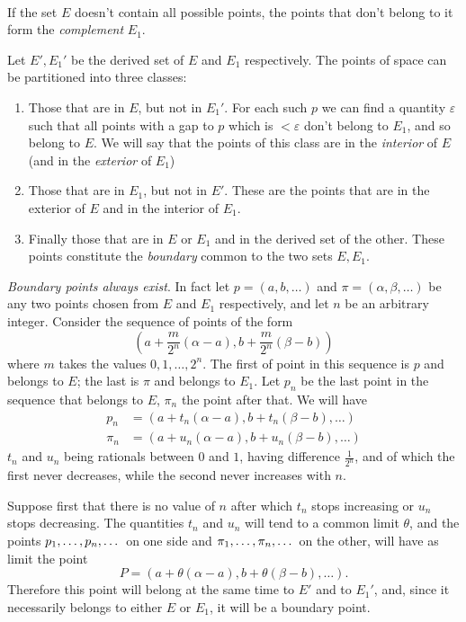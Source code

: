 \documentclass[10pt,letterpaper]{book}
\renewcommand\epsilon{\varepsilon}
\theoremstyle{definition}
\begin{document}
\paragraph{} If the set $E$ doesn't contain all possible points, the points that don't belong to it form the \textit{complement} $E_1$.

Let $E',E_1'$ be the derived set of $E$ and $E_1$ respectively. The points of space can be partitioned into three classes:
\begin{enumerate}[$1^o$]
\item Those that are in $E$, but not in $E_1'$. For each such $p$ we can find a quantity $\epsilon$ such that all points with a gap to $p$ which is $<\epsilon$ don't belong to $E_1$, and so belong to $E$. We will say that the points of this class are in the \textit{interior} of $E$ (and in the \textit{exterior} of $E_1$)
\item Those that are in $E_1$, but not in $E'$. These are the points that are in the exterior of $E$ and in the interior of $E_1$.
\item Finally those that are in $E$ or $E_1$ and in the derived set of the other. These points constitute the \textit{boundary} common to the two sets $E, E_1$.
\end{enumerate}
\textit{Boundary points always exist}. In fact let $p=(a,b,\dots)$ and $\pi=(\alpha,\beta,\dots)$ be any two points chosen from $E$ and $E_1$ respectively, and let $n$ be an arbitrary integer. Consider the sequence of points of the form
\[
  \left(a+\frac{m}{2^n}(\alpha-a), b+\frac{m}{2^n}(\beta-b)\right)
\]
where $m$ takes the values $0, 1,\dots,2^n$. The first of point in this sequence is $p$ and belongs to $E$; the last is $\pi$ and belongs to $E_1$. Let $p_n$ be the last point in the sequence that belongs to $E$, $\pi_n$ the point after that. We will have
\begin{align*}
  p_n   &= (a+t_n(\alpha-a), b+t_n(\beta-b),\dots) \\
  \pi_n &= (a+u_n(\alpha-a), b+u_n(\beta-b),\dots)
\end{align*}
$t_n$ and $u_n$ being rationals between $0$ and $1$, having difference $\frac 1 {2^n}$, and of which the first never decreases, while the second never increases with $n$.

Suppose first that there is no value of $n$ after which $t_n$ stops increasing or $u_n$ stops decreasing. The quantities $t_n$ and $u_n$ will tend to a common limit $\theta$, and the points ${p_1}, \dots, {p_n}, \dots$ on one side and ${\pi_1}, \dots, {\pi_n}, \dots$ on the other, will have as limit the point
\[
  P = (a+\theta(\alpha-a), b+\theta(\beta-b),\dots).
\]
Therefore this point will belong at the same time to $E'$ and to $E_1'$, and, since it necessarily belongs to either $E$ or $E_1$, it will be a boundary point.
\end{document}
